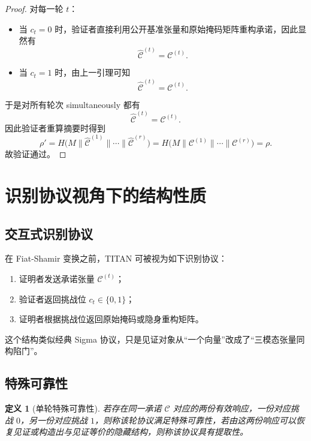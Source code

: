 \documentclass[12pt,a4paper]{article}
\newtheorem{definition}{定义}[section]
\theoremstyle{remark}
\begin{document}
\begin{proof}
对每一轮 $t$：
\begin{itemize}
    \item 当 $c_t=0$ 时，验证者直接利用公开基准张量和原始掩码矩阵重构承诺，因此显然有
    \[
    \widehat{\mathcal{C}}^{(t)}=\mathcal{C}^{(t)}.
    \]
    \item 当 $c_t=1$ 时，由上一引理可知
    \[
    \widehat{\mathcal{C}}^{(t)}=\mathcal{C}^{(t)}.
    \]
\end{itemize}

于是对所有轮次 simultaneously 都有
\[
\widehat{\mathcal{C}}^{(t)}=\mathcal{C}^{(t)}.
\]
因此验证者重算摘要时得到
\[
\rho'
=H\big(M\parallel \widehat{\mathcal{C}}^{(1)}\parallel \cdots \parallel \widehat{\mathcal{C}}^{(r)}\big)
=H\big(M\parallel \mathcal{C}^{(1)}\parallel \cdots \parallel \mathcal{C}^{(r)}\big)
=\rho.
\]
故验证通过。
\end{proof}

\section{识别协议视角下的结构性质}

\subsection{交互式识别协议}

在 Fiat-Shamir 变换之前，TITAN 可被视为如下识别协议：
\begin{enumerate}
    \item 证明者发送承诺张量 $\mathcal{C}^{(t)}$；
    \item 验证者返回挑战位 $c_t\in\{0,1\}$；
    \item 证明者根据挑战位返回原始掩码或隐身重构矩阵。
\end{enumerate}

这个结构类似经典 Sigma 协议，只是见证对象从“一个向量”改成了“三模态张量同构陷门”。

\subsection{特殊可靠性}

\begin{definition}[单轮特殊可靠性]
若存在同一承诺 $\mathcal{C}$ 对应的两份有效响应，一份对应挑战 $0$，另一份对应挑战 $1$，则称该轮协议满足特殊可靠性，若由这两份响应可以恢复见证或构造出与见证等价的隐藏结构，则称该协议具有提取性。
\end{definition}
\end{document}
